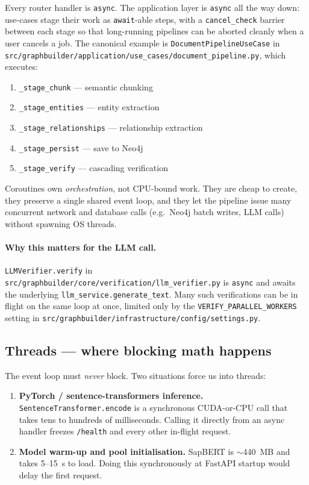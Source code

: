 \documentclass[11pt,a4paper]{article}
\begin{document}
Every router handler is \texttt{async}. The application layer is
\texttt{async} all the way down: use-cases stage their work as
\texttt{await}-able steps, with a \texttt{cancel\_check} barrier between
each stage so that long-running pipelines can be aborted cleanly when a
user cancels a job. The canonical example is
\texttt{DocumentPipelineUseCase} in
\texttt{src/graphbuilder/application/use\_cases/document\_pipeline.py},
which executes:

\begin{enumerate}[leftmargin=*,itemsep=2pt]
  \item \texttt{\_stage\_chunk}     --- semantic chunking
  \item \texttt{\_stage\_entities}  --- entity extraction
  \item \texttt{\_stage\_relationships} --- relationship extraction
  \item \texttt{\_stage\_persist}   --- save to Neo4j
  \item \texttt{\_stage\_verify}    --- cascading verification
\end{enumerate}

Coroutines own \emph{orchestration}, not CPU-bound work. They are cheap
to create, they preserve a single shared event loop, and they let the
pipeline issue many concurrent network and database calls (e.g.\ Neo4j
batch writes, LLM calls) without spawning OS threads.

\paragraph{Why this matters for the LLM call.}
\texttt{LLMVerifier.verify} in
\texttt{src/graphbuilder/core/verification/llm\_verifier.py} is
\texttt{async} and awaits the underlying \texttt{llm\_service.generate\_text}.
Many such verifications can be in flight on the same loop at once,
limited only by the \texttt{VERIFY\_PARALLEL\_WORKERS} setting in
\texttt{src/graphbuilder/infrastructure/config/settings.py}.

\subsection{Threads --- where blocking math happens}

The event loop must \emph{never} block. Two situations force us into
threads:

\begin{enumerate}[leftmargin=*]
  \item \textbf{PyTorch / sentence-transformers inference.}
        \texttt{SentenceTransformer.encode} is a synchronous CUDA-or-CPU
        call that takes tens to hundreds of milliseconds. Calling it
        directly from an async handler freezes \texttt{/health} and
        every other in-flight request.
  \item \textbf{Model warm-up and pool initialisation.}
        SapBERT is $\sim$440~MB and takes 5--15~s to load. Doing this
        synchronously at FastAPI startup would delay the first request.
\end{enumerate}
\end{document}
